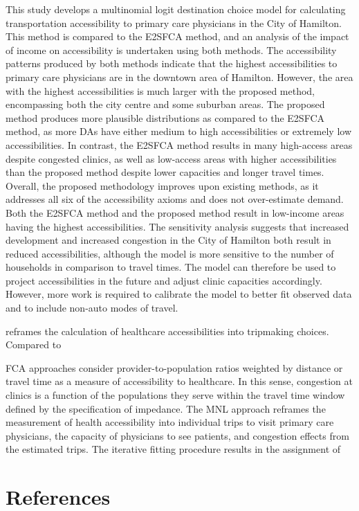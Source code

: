 \documentclass{article}
\begin{document}
This study develops a multinomial logit destination choice model for
calculating transportation accessibility to primary care physicians in
the City of Hamilton. This method is compared to the E2SFCA method, and
an analysis of the impact of income on accessibility is undertaken using
both methods. The accessibility patterns produced by both methods
indicate that the highest accessibilities to primary care physicians are
in the downtown area of Hamilton. However, the area with the highest
accessibilities is much larger with the proposed method, encompassing
both the city centre and some suburban areas. The proposed method
produces more plausible distributions as compared to the E2SFCA method,
as more DAs have either medium to high accessibilities or extremely low
accessibilities. In contrast, the E2SFCA method results in many
high-access areas despite congested clinics, as well as low-access areas
with higher accessibilities than the proposed method despite lower
capacities and longer travel times. Overall, the proposed methodology
improves upon existing methods, as it addresses all six of the
accessibility axioms and does not over-estimate demand. Both the E2SFCA
method and the proposed method result in low-income areas having the
highest accessibilities. The sensitivity analysis suggests that
increased development and increased congestion in the City of Hamilton
both result in reduced accessibilities, although the model is more
sensitive to the number of households in comparison to travel times. The
model can therefore be used to project accessibilities in the future and
adjust clinic capacities accordingly. However, more work is required to
calibrate the model to better fit observed data and to include non-auto
modes of travel.

reframes the calculation of healthcare accessibilities into tripmaking
choices. Compared to

FCA approaches consider provider-to-population ratios weighted by
distance or travel time as a measure of accessibility to healthcare. In
this sense, congestion at clinics is a function of the populations they
serve within the travel time window defined by the specification of
impedance. The MNL approach reframes the measurement of health
accessibility into individual trips to visit primary care physicians,
the capacity of physicians to see patients, and congestion effects from
the estimated trips. The iterative fitting procedure results in the
assignment of

\hypertarget{references}{%
\section*{References}\label{references}}
\end{document}
